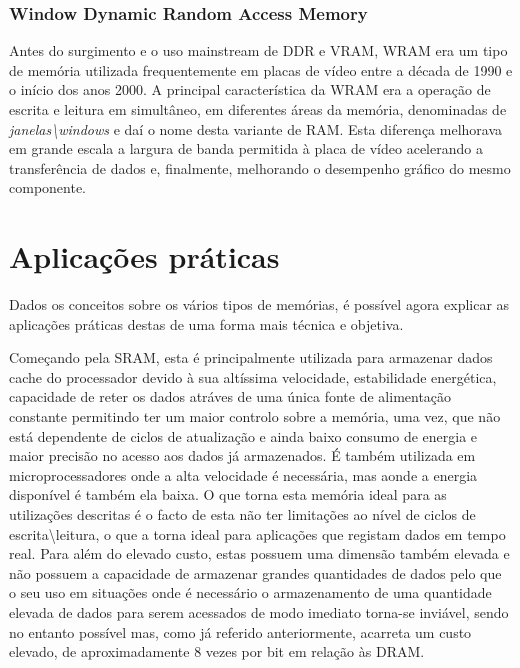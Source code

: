 \documentclass{report}
\begin{document}
\subsection{Window Dynamic Random Access Memory}


\par Antes do surgimento e o uso mainstream de \ac{DDR} e \ac{VRAM}, \ac{WRAM} era um tipo de memória utilizada frequentemente em placas de vídeo entre a década de 1990 e o início dos anos 2000. A principal característica da \ac{WRAM} era a operação de escrita e leitura em simultâneo, em diferentes áreas da memória, denominadas de \textit{janelas\textbackslash windows} e daí o nome desta variante de \ac{RAM}. Esta diferença melhorava em grande escala a largura de banda permitida à placa de vídeo acelerando a transferência de dados e, finalmente, melhorando o desempenho gráfico do mesmo componente.






\chapter{Aplicações práticas}
\par Dados os conceitos sobre os vários tipos de memórias, é possível agora explicar as aplicações práticas destas de uma forma mais técnica e objetiva.
\par Começando pela \ac{SRAM}, esta é principalmente utilizada para armazenar dados cache do processador devido à sua altíssima velocidade, estabilidade energética, capacidade de reter os dados atráves de uma única fonte de alimentação constante permitindo ter um maior controlo sobre a memória, uma vez, que não está dependente de ciclos de atualização e ainda baixo consumo de energia e maior precisão no acesso aos dados já armazenados. É também utilizada em microprocessadores onde a alta velocidade é necessária, mas aonde a energia disponível é também ela baixa. O que torna esta memória ideal para as utilizações descritas é o facto de esta não ter limitações ao nível de ciclos de escrita\textbackslash leitura, o que a torna ideal para aplicações que registam dados em tempo real. Para além do elevado custo, estas possuem uma dimensão também elevada e não possuem a capacidade de armazenar grandes quantidades de dados pelo que o seu uso em situações onde é necessário o armazenamento de uma quantidade elevada de dados para serem acessados de modo imediato torna-se inviável, sendo no entanto possível mas, como já referido anteriormente, acarreta um custo elevado, de aproximadamente 8 vezes por bit em relação às \ac{DRAM}.
\end{document}
